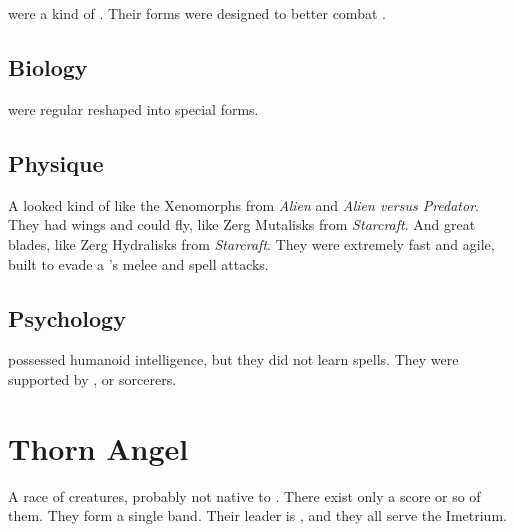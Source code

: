\section{\Screamer}
\index{\Screamer}
\Screamers were a kind of \banes. 
Their forms were designed to better combat \dragons. 









\subsection{Biology}
\Screamers were regular \banes reshaped into special forms. 









\subsection{Physique}
A \screamer looked kind of like the Xenomorphs from \emph{Alien} and \emph{Alien versus Predator}. 
They had wings and could fly, like Zerg Mutalisks from \emph{Starcraft}. 
And great blades, like Zerg Hydralisks from \emph{Starcraft}. 
They were extremely fast and agile, built to evade a \dragon's melee and spell attacks.









\subsection{Psychology} 
\Screamers possessed humanoid intelligence, but they did not learn spells. 
They were supported by \lesserbane, \baneknight or \banelord sorcerers. 



















\section{Thorn Angel}
A race of creatures, probably not native to \Miith{}. 
There exist only a score or so of them. 
They form a single band. 
Their leader is \Hiothrex{}, and they all serve the Imetrium. 
















